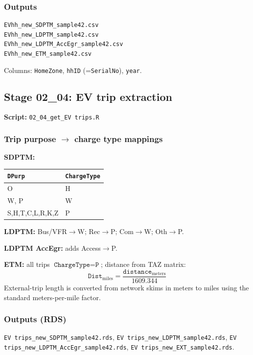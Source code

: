 \documentclass[11pt,a4paper]{article}
\begin{document}
\subsubsection{Outputs}
\begin{lstlisting}
EVhh_new_SDPTM_sample42.csv
EVhh_new_LDPTM_sample42.csv
EVhh_new_LDPTM_AccEgr_sample42.csv
EVhh_new_ETM_sample42.csv
\end{lstlisting}
Columns: \texttt{HomeZone}, \texttt{hhID} (=\texttt{SerialNo}), \texttt{year}.

\subsection{Stage 02\_04: EV trip extraction}
\textbf{Script:} \texttt{02\_04\_get\_EV trips.R}

\subsubsection{Trip purpose $\to$ charge type mappings}

\textbf{SDPTM:}
\begin{center}
\small
\begin{tabular}{ll}
\toprule
\texttt{DPurp} & \texttt{ChargeType} \\
\midrule
O & H \\
W, P & W \\
S,H,T,C,L,R,K,Z & P \\
\bottomrule
\end{tabular}
\end{center}

\textbf{LDPTM:} Bus/VFR$\to$W; Rec$\to$P; Com$\to$W; Oth$\to$P.

\textbf{LDPTM AccEgr:} adds Access$\to$P.

\textbf{ETM:} all trips $\texttt{ChargeType}=\texttt{P}$; distance from TAZ matrix:
\begin{equation}
  \texttt{Dist}_{\text{miles}} = \frac{\texttt{distance}_{\text{meters}}}{1609.344}
\end{equation}
\noindent External-trip length is converted from network skims in meters to miles using the standard meters-per-mile factor.

\subsubsection{Outputs (RDS)}
\texttt{EV trips\_new\_SDPTM\_sample42.rds}, \texttt{EV trips\_new\_LDPTM\_sample42.rds}, \texttt{EV trips\_new\_LDPTM\_AccEgr\_sample42.rds}, \texttt{EV trips\_new\_EXT\_sample42.rds}.
\end{document}
